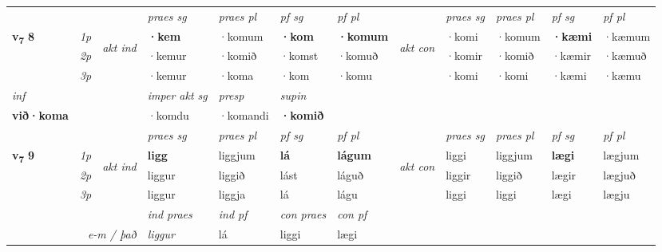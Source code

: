 \begin{longtable}[l]{X>{\footnotesize\itshape}llXXXXlXXXX}
 & &   & \textit{praes sg}  & \textit{praes pl}    & \textit{ pf sg} & \textit{pf pl} & & \textit{praes sg}  & \textit{praes pl}    & \textit{pf sg} & \textit{pf pl }  \\ \cmidrule{4-7} \cmidrule{9-12}
 \multirow{2}{*}{{{\textbf{v{\textsubscript{7}}} \Large{\textbf{8}}}}}  & 1p & \multirow{3}{*}{\begin{turn}{90}\textit{akt ind}\end{turn}} & \textbf{·kem} & ·komum & \textbf{·kom} & \textbf{·komum} & \multirow{3}{*}{\begin{turn}{90}\textit{akt con}\end{turn}} &·komi & ·komum & \textbf{·kæmi} & ·kæmum\\*
 & 2p &  &  ·kemur  & ·komið & ·komst & ·komuð & & ·komir & ·komið & ·kæmir & ·kæmuð \\*
 & 3p &  & ·kemur & ·koma & ·kom & ·komu & & ·komi & ·komi& ·kæmi & ·kæmu \\*
\cmidrule{4-7} \cmidrule{9-12}

   {\textit{inf}} & &  & \textit{imper akt sg}    & \textit{presp} & \textit{supin}   \\*
  {\textbf{við\allowbreak ·koma}} & && ·komdu     & ·komandi &  \textbf{·komið}   \\*

\midrule

 & &   & \textit{praes sg}  & \textit{praes pl}    & \textit{ pf sg} & \textit{pf pl} & & \textit{praes sg}  & \textit{praes pl}    & \textit{pf sg} & \textit{pf pl }  \\ \cmidrule{4-7} \cmidrule{9-12}
 \multirow{2}{*}{{{\textbf{v{\textsubscript{7}}} \Large{\textbf{9}}}}}  & 1p & \multirow{3}{*}{\begin{turn}{90}\textit{akt ind}\end{turn}} & \textbf{ligg} & liggjum & \textbf{lá} & \textbf{lágum} & \multirow{3}{*}{\begin{turn}{90}\textit{akt con}\end{turn}} &liggi & liggjum & \textbf{lægi} & lægjum\\*
 & 2p &  &  liggur  & liggið & lást & láguð & & liggir & liggið & lægir & lægjuð \\*
 & 3p &  & liggur & liggja & lá & lágu & & liggi & liggi& lægi & lægju \\*
\cmidrule{4-7} \cmidrule{9-12}

   && &  \textit{ind praes} & \textit{ind pf} & \textit{con praes} & \textit{con pf} \\*
\multicolumn{3}{r}{\textit{e-m / það}} & liggur & lá & liggi & lægi \\*


\end{longtable}
